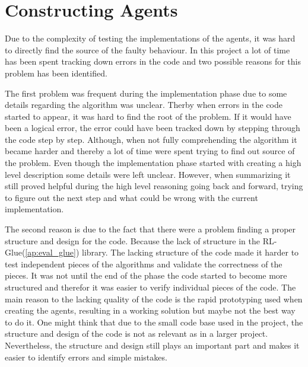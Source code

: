 \section{Constructing Agents}
\label{ap:constructing_experiments}
Due to the complexity of testing the implementations of the agents, it was hard to directly find the source of the faulty behaviour. In this project a lot of time has been spent tracking down errors in the code and two possible reasons for this problem has been identified.

The first problem was frequent during the implementation phase due to some details regarding the algorithm was unclear. Therby when errors in the code started to appear, it was hard to find the root of the problem. If it would have been a logical error, the error could have been tracked down by stepping through the code step by step. Although, when not fully comprehending the algorithm it became harder and thereby a lot of time were spent trying to find out source of the problem. Even though the implementation phase started with creating a high level description some details were left unclear. However, when summarizing it still proved helpful during the high level reasoning going back and forward, trying to figure out the next step and what could be wrong with the current implementation.

The second reason is due to the fact that there were a problem finding a proper structure and design for the code. Because the lack of structure in the RL-Glue(\ref{ap:eval_glue}) library. The lacking structure of the code made it harder to test independent pieces of the algorithms and validate the correctness of the pieces. It was not until the end of the phase the code started to become more structured and therefor it was easier to verify individual pieces of the code. The main reason to the lacking quality of the code is the rapid prototyping used when creating the agents, resulting in a working solution but maybe not the best way to do it. One might think that due to the small code base used in the project, the structure and design of the code is not as relevant as in a larger project. Nevertheless, the structure and design still plays an important part and makes it easier to identify errors and simple mistakes.